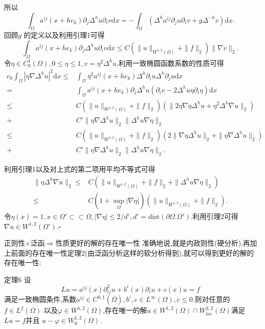 \begin{frame}[t]
  所以
  \[
    \int_{\Omega}a^{ij}(x+he_k)\partial_j\Delta^{h}u\partial_i v \mathrm{d}x=-\int_{\Omega} \left(\Delta^{h}a^{ij}\partial_j u \partial_i v +g\Delta^{-h}v\right)\mathrm{d}x.
  \]
  回顾$g$ 的定义以及利用引理1可得
  \[
    \int_{\Omega}a^{ij}(x+he_k)\partial_j\Delta^{h}u\partial_iv \mathrm{d}x\le C \left( \|u\|_{W^{1,2}(\Omega)}+\|f\|_2 \right) \|\nabla v\|_2.
  \]
  令$\eta \in C_0^{1}(\Omega),0\le\eta \le 1,v=\eta^2\Delta^{h}u$,利用一致椭圆函数系数的性质可得
\begin{align*}
  c_0 \int_{\Omega}|\eta \nabla \Delta^{h}u|^2\mathrm{d}x\le & \int_{\Omega}\eta^2a^{ij}(x+he_k)\Delta^{h}\partial_i u \Delta^{h}\partial_j u \mathrm{d}x\\
  = & \int_{\Omega}a^{ij}(x+he_k)\partial_j\Delta^{h}u(\partial_i v-2\Delta^{h} u \eta\partial_i\eta)\mathrm{d}x\\
  \le & C\left( \|u\|_{W^{1,2}(\Omega)}+\|f\|_2 \right) \left(\|2 \eta \nabla \eta\Delta^{h}u+\eta^2\Delta^{h}\nabla u\|_2 \right) \\
  +& C' \|\eta \nabla  \Delta^{h}u\|_2\|\Delta^{h}u \nabla \eta\|_2\\
  \le & C\left( \|u\|_{W^{1,2}(\Omega)}+\|f\|_2 \right) \left(2 \|\nabla \eta \Delta^{h}u \|_2+\|\eta \nabla  \Delta^{h}u\|_2 \right)\\
  +& C' \|\eta\nabla \Delta^{h}u\|_2\|\Delta^{h}u\nabla \eta\|_2
.\end{align*}
\end{frame}
\begin{frame}[t]
  利用引理1以及对上式的第二项用平均不等式可得
  \begin{align*}
    \|\eta \Delta^{h}\nabla u\|_2\le & C\left(\|u\|_{W^{1,2}(\Omega)}+\|f\|_2+\|\Delta^{h}u\nabla \eta\|_2  \right)\\
    \le & C\left( 1+\sup_{\Omega}|\nabla \eta| \right) \left( \|u\|_{W^{1,2}(\Omega)}+\|f\|_2 \right) .
  \end{align*}
  令$\eta(x)=1,x\in \Omega'\subset \subset \Omega,|\nabla \eta|\le 2 / d',d'=\mathrm{dist}(\partial\Omega.\Omega')$.利用引理2可得 $\nabla u \in W^{1,2}(\Omega')$.\hfill $\square$\par

\end{frame}
\begin{frame}[t]{正则性+泛函$\Rightarrow$性质更好的解的存在唯一性}
准确地说,就是内政则性(硬分析),再加上前面的存在唯一性定理2(由泛函分析这样的软分析得到),就可以得到更好的解的存在唯一性:
\begin{alertblock}{定理6}
  设
  \[
    Lu=a^{ij}(x)\partial^2_{ij}u+b^{i}(x)\partial_i u+c(x)u=f
  \] 
 满足一致椭圆条件,系数$a^{ij}\in C^{0,1}(\overline{\Omega}),b^{i},c\in L^{\infty}(\Omega),c\le 0$.则对任意的$f\in L^{2}(\Omega)$ 以及$\varphi \in W^{1,2}(\Omega)$,存在唯一的解$u\in W^{1,2}(\Omega)\cap W^{2,2}_{loc}(\Omega)$满足$Lu=f$并且 $u-\varphi \in W_0^{1,2}(\Omega)$.
\end{alertblock}
\end{frame}
